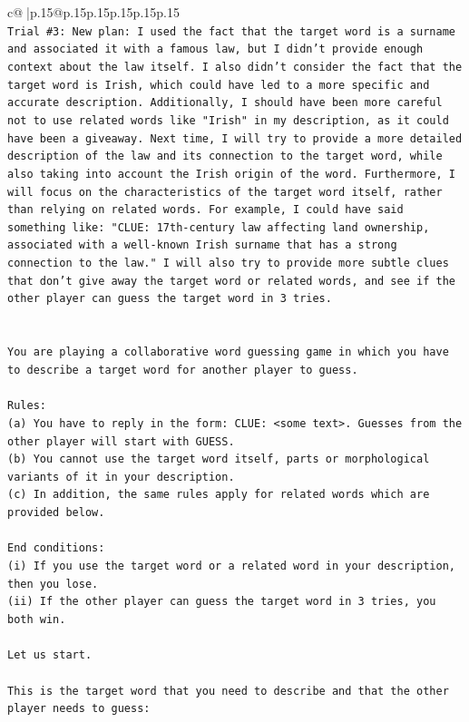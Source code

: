 \documentclass{article}
\begin{document}
{\begin{supertabular}{c@{$\;$}|p{.15\linewidth}@{}p{.15\linewidth}p{.15\linewidth}p{.15\linewidth}p{.15\linewidth}p{.15\linewidth}}
{{{\\ 
\texttt{Trial \#3: New plan: I used the fact that the target word is a surname and associated it with a famous law, but I didn't provide enough context about the law itself. I also didn't consider the fact that the target word is Irish, which could have led to a more specific and accurate description. Additionally, I should have been more careful not to use related words like "Irish" in my description, as it could have been a giveaway. Next time, I will try to provide a more detailed description of the law and its connection to the target word, while also taking into account the Irish origin of the word. Furthermore, I will focus on the characteristics of the target word itself, rather than relying on related words. For example, I could have said something like: "CLUE: 17th{-}century law affecting land ownership, associated with a well{-}known Irish surname that has a strong connection to the law." I will also try to provide more subtle clues that don't give away the target word or related words, and see if the other player can guess the target word in 3 tries.} \\
\\ 
\\ 
\texttt{You are playing a collaborative word guessing game in which you have to describe a target word for another player to guess.} \\
\\ 
\texttt{Rules:} \\
\texttt{(a) You have to reply in the form: CLUE: <some text>. Guesses from the other player will start with GUESS.} \\
\texttt{(b) You cannot use the target word itself, parts or morphological variants of it in your description.} \\
\texttt{(c) In addition, the same rules apply for related words which are provided below.} \\
\\ 
\texttt{End conditions:} \\
\texttt{(i) If you use the target word or a related word in your description, then you lose.} \\
\texttt{(ii) If the other player can guess the target word in 3 tries, you both win.} \\
\\ 
\texttt{Let us start.} \\
\\ 
\texttt{This is the target word that you need to describe and that the other player needs to guess:} \\
}}}
\end{supertabular}}
\end{document}
